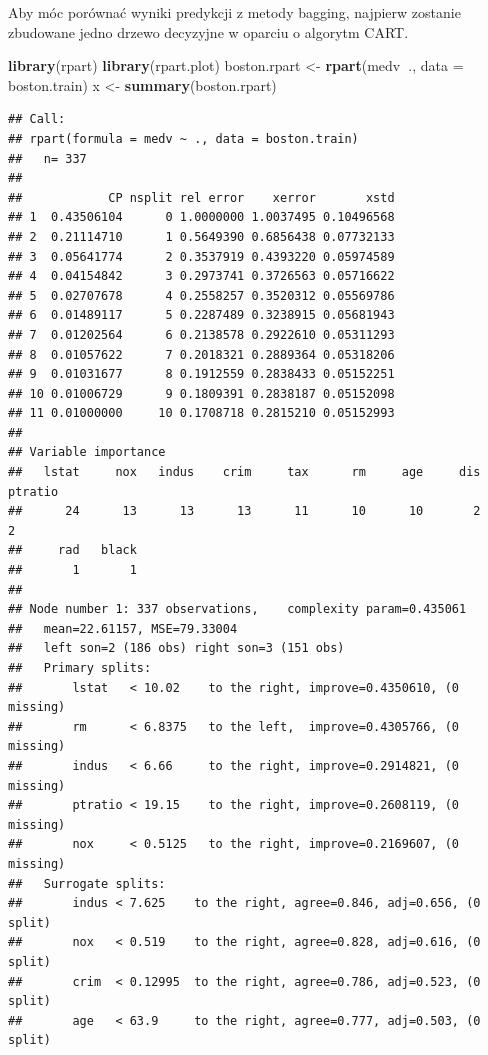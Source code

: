 \documentclass[]{book}
\newenvironment{Shaded}{\begin{snugshade}}{\end{snugshade}}
\newcommand{\DataTypeTok}[1]{\textcolor[rgb]{0.13,0.29,0.53}{#1}}
\newcommand{\KeywordTok}[1]{\textcolor[rgb]{0.13,0.29,0.53}{\textbf{#1}}}
\newcommand{\NormalTok}[1]{#1}
\newcommand{\OperatorTok}[1]{\textcolor[rgb]{0.81,0.36,0.00}{\textbf{#1}}}
\newcommand{\StringTok}[1]{\textcolor[rgb]{0.31,0.60,0.02}{#1}}
\theoremstyle{plain}
\theoremstyle{definition}
\theoremstyle{definition}
\theoremstyle{definition}
\theoremstyle{definition}
\theoremstyle{remark}
\begin{document}
Aby móc porównać wyniki predykcji z metody bagging, najpierw zostanie zbudowane jedno drzewo decyzyjne w oparciu o algorytm CART.

\begin{Shaded}
\begin{Highlighting}[]
\KeywordTok{library}\NormalTok{(rpart)}
\KeywordTok{library}\NormalTok{(rpart.plot)}
\NormalTok{boston.rpart <-}\StringTok{ }\KeywordTok{rpart}\NormalTok{(medv}\OperatorTok{~}\NormalTok{., }\DataTypeTok{data =}\NormalTok{ boston.train)}
\NormalTok{x <-}\StringTok{ }\KeywordTok{summary}\NormalTok{(boston.rpart)}
\end{Highlighting}
\end{Shaded}

\begin{verbatim}
## Call:
## rpart(formula = medv ~ ., data = boston.train)
##   n= 337 
## 
##            CP nsplit rel error    xerror       xstd
## 1  0.43506104      0 1.0000000 1.0037495 0.10496568
## 2  0.21114710      1 0.5649390 0.6856438 0.07732133
## 3  0.05641774      2 0.3537919 0.4393220 0.05974589
## 4  0.04154842      3 0.2973741 0.3726563 0.05716622
## 5  0.02707678      4 0.2558257 0.3520312 0.05569786
## 6  0.01489117      5 0.2287489 0.3238915 0.05681943
## 7  0.01202564      6 0.2138578 0.2922610 0.05311293
## 8  0.01057622      7 0.2018321 0.2889364 0.05318206
## 9  0.01031677      8 0.1912559 0.2838433 0.05152251
## 10 0.01006729      9 0.1809391 0.2838187 0.05152098
## 11 0.01000000     10 0.1708718 0.2815210 0.05152993
## 
## Variable importance
##   lstat     nox   indus    crim     tax      rm     age     dis ptratio 
##      24      13      13      13      11      10      10       2       2 
##     rad   black 
##       1       1 
## 
## Node number 1: 337 observations,    complexity param=0.435061
##   mean=22.61157, MSE=79.33004 
##   left son=2 (186 obs) right son=3 (151 obs)
##   Primary splits:
##       lstat   < 10.02    to the right, improve=0.4350610, (0 missing)
##       rm      < 6.8375   to the left,  improve=0.4305766, (0 missing)
##       indus   < 6.66     to the right, improve=0.2914821, (0 missing)
##       ptratio < 19.15    to the right, improve=0.2608119, (0 missing)
##       nox     < 0.5125   to the right, improve=0.2169607, (0 missing)
##   Surrogate splits:
##       indus < 7.625    to the right, agree=0.846, adj=0.656, (0 split)
##       nox   < 0.519    to the right, agree=0.828, adj=0.616, (0 split)
##       crim  < 0.12995  to the right, agree=0.786, adj=0.523, (0 split)
##       age   < 63.9     to the right, agree=0.777, adj=0.503, (0 split)

\end{verbatim}
\end{document}
